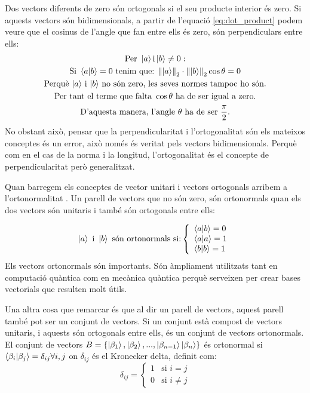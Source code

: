 Dos vectors diferents de zero són ortogonals si el seu producte interior és zero. Si aquests vectors són bidimensionals, a partir de l'equació \eqref{eq:dot_product} podem veure que el cosinus de l'angle que fan entre ells és zero, són perpendiculars entre ells:
\begin{multline*}
	 \text{Per }\ket{a} \text{i} \ket{b}\neq 0 : \\
	\text{Si }\bra{a}\ket{b} = 0 \text{ tenim que: } \norm{\ket{a}}_2 \cdot \norm{\ket{b}}_2 \cos \theta = 0 \\
	 \text{Perquè $\ket{a}$ i $\ket{b}$ no són zero, les seves normes tampoc ho són.} \\
	 \text{Per tant el terme que falta } \cos\theta \text{ ha de ser igual a zero.} \\
	 \text{D'aquesta manera, l'angle $\theta$ ha de ser } \frac{\pi}{2}. \\
\end{multline*}
No obstant això, pensar que la perpendicularitat i l'ortogonalitat són els mateixos conceptes és un error, això només és veritat pels vectors bidimensionals. Perquè com en el cas de la norma i la longitud, l'ortogonalitat és el concepte de perpendicularitat però generalitzat.

Quan barregem els conceptes de vector unitari i vectors ortogonals arribem a l'ortonormalitat \cite{QCandQI:GramSchmidt}. Un parell de vectors que no són zero, són ortonormals quan els dos vectors són unitaris i també són ortogonals entre ells:

$$
\ket{a} \text{ i } \ket{b} \text{ són ortonormals si:} \left\{
	\begin{array}{ll}
		\bra{a}\ket{b} = 0 \\
		\bra{a}\ket{a} = 1 \\
		\bra{b}\ket{b} = 1 \\
	\end{array}
\right.
$$
Els vectors ortonormals són importants. Són àmpliament utilitzats tant en computació quàntica com en mecànica quàntica perquè serveixen per crear bases vectorials que resulten molt útils.

Una altra cosa que remarcar és que al dir un parell de vectors, aquest parell també pot ser un conjunt de vectors. Si un conjunt està compost de vectors unitaris, i aquests són ortogonals entre ells, és un conjunt de vectors ortonormals.
El conjunt de vectors $ B = \{\ket{\beta_1}, \ket{\beta_2}, ..., \ket{\beta_{n-1}} \ket{\beta_n}\} $ és ortonormal si $\bra{\beta_i}\ket{\beta_j} = \delta_{ij}  \forall i, j$ \cite{QCandQI:GramSchmidt} on $\delta_{ij}$ és el Kronecker delta, definit com:
$$
\delta_{ij} =
\begin{cases}
	1 &\text{si } i=j\\
	0 &\text{si } i\neq j
\end{cases}
$$

